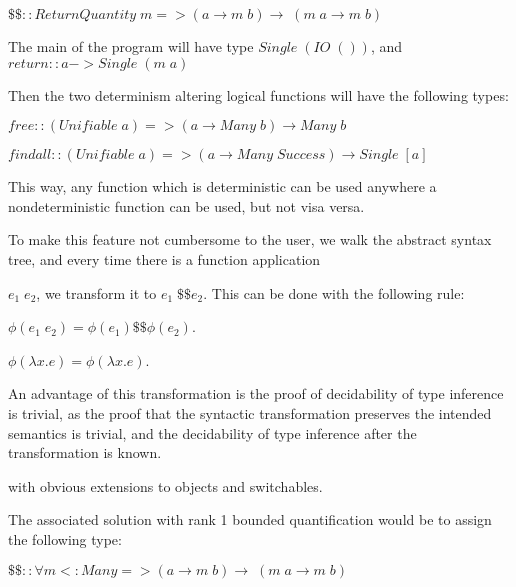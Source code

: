 \documentclass[english]{article}
\begin{document}
$ \$\$:: ReturnQuantity\; m => (a \rightarrow m\; b) \rightarrow \; (m \; a \rightarrow m \;b)$

The main of the program will have type $Single \; (IO \; ())$,
and $return :: a -> Single \; (m \; a)$


Then the two determinism altering logical functions will have the following types:

$free :: (Unifiable \; a) => (a \rightarrow Many \; b) \rightarrow Many\; b $

$findall :: (Unifiable \; a) => (a \rightarrow Many \; Success) \rightarrow Single \; [a]$

This way, any function which is deterministic can be used anywhere a nondeterministic function can be used, but not visa versa.

To make this feature not cumbersome to the user, we walk the abstract syntax tree, and every time there is a function application

$ e_1 \; e_2 $, we transform it to $ e_1 \; \$\$ e_2 $.  This can be done with the following rule:

$\phi (e_1 \; e_2) = \phi (e_1) \$\$ \phi (e_2) $.

$\phi (\lambda x . e ) = \phi (\lambda x . e)$.

An advantage of this transformation is the proof of decidability of type inference is trivial, as the proof that the syntactic transformation 
preserves the intended semantics is trivial, and the decidability of type inference after the transformation is known.

with obvious extensions to objects and switchables.

The associated solution with rank 1 bounded quantification would be to assign the following type:  


$ \$\$:: \forall m <: Many => (a \rightarrow m \; b) \rightarrow \; (m \; a \rightarrow m \;b)$
\end{document}

